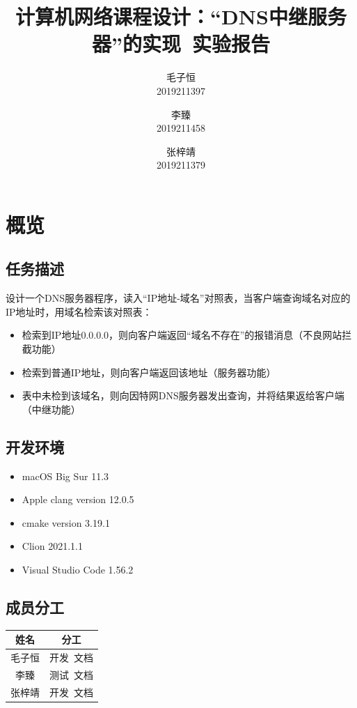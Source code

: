 \documentclass[lang=cn,11pt,a4paper,cite=authornum]{paper}
\title{计算机网络课程设计：“DNS中继服务器”的实现\ 实验报告}
\author{毛子恒 \\ 2019211397 \and 李臻 \\ 2019211458 \and 张梓靖 \\ 2019211379}
\institute{北京邮电大学\ 计算机学院}
\date{\zhtoday}
\begin{document}
\maketitle

\section{概览}

\subsection{任务描述}

\label{basic}设计一个DNS服务器程序，读入“IP地址-域名”对照表，当客户端查询域名对应的IP地址时，用域名检索该对照表：

\begin{itemize}
    \item 检索到IP地址0.0.0.0，则向客户端返回“域名不存在”的报错消息（不良网站拦截功能）
    \item 检索到普通IP地址，则向客户端返回该地址（服务器功能）
    \item 表中未检到该域名，则向因特网DNS服务器发出查询，并将结果返给客户端（中继功能）
\end{itemize}

\subsection{开发环境}

\begin{itemize}
    \item macOS Big Sur 11.3
    \item Apple clang version 12.0.5
    \item cmake version 3.19.1
    \item Clion 2021.1.1
    \item Visual Studio Code 1.56.2
\end{itemize}

\subsection{成员分工}

\setlength{\tabcolsep}{6mm}
{
    \begin{table}[htbp]
        \centering
        \begin{tabular}{cc}
            姓名 & 分工 \\
            \hline 
            毛子恒 & 开发\ 文档 \\
            李臻 & 测试\ 文档 \\
            张梓靖 & 开发\ 文档 \\
        \end{tabular}
    \end{table}
}
\end{document}
